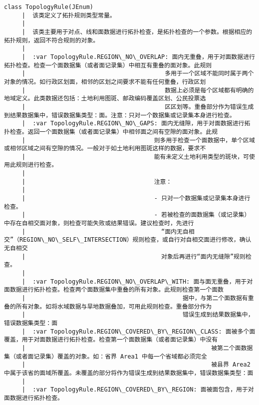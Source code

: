\documentclass[11pt]{article}
\begin{document}
\begin{Verbatim}[commandchars=\\\{\}]
    class TopologyRule(JEnum)
     |  该类定义了拓扑规则类型常量。
     |  
     |  该类主要用于对点、线和面数据进行拓扑检查，是拓扑检查的一个参数。根据相应的拓扑规则，返回不符合规则的对象。
     |  
     |  :var TopologyRule.REGION\_NO\_OVERLAP: 面内无重叠，用于对面数据进行拓扑检查。检查一个面数据集（或者面记录集）中相互有重叠的面对象。此规则
     |                                       多用于一个区域不能同时属于两个对象的情况。如行政区划面，相邻的区划之间要求不能有任何重叠，行政区划
     |                                       数据上必须是每个区域都有明确的地域定义。此类数据还包括：土地利用图斑、邮政编码覆盖区划、公民投票选
     |                                       区区划等。重叠部分作为错误生成到结果数据集中，错误数据集类型：面。注意：只对一个数据集或记录集本身进行检查。
     |  :var TopologyRule.REGION\_NO\_GAPS: 面内无缝隙，用于对面数据进行拓扑检查。返回一个面数据集（或者面记录集）中相邻面之间有空隙的面对象。此规
     |                                    则多用于检查一个面数据中，单个区域或相邻区域之间有空隙的情况。一般对于如土地利用图斑这样的数据，要求不
     |                                    能有未定义土地利用类型的斑块，可使用此规则进行检查。
     |  
     |                                    注意：
     |  
     |                                    - 只对一个数据集或记录集本身进行检查。
     |                                    - 若被检查的面数据集（或记录集）中存在自相交面对象，则检查可能失败或结果错误。建议检查时，先进行
     |                                      “面内无自相交”（REGION\_NO\_SELF\_INTERSECTION）规则检查，或自行对自相交面进行修改，确认无自相交
     |                                      对象后再进行“面内无缝隙”规则检查。
     |  
     |  :var TopologyRule.REGION\_NO\_OVERLAP\_WITH: 面与面无重叠，用于对面数据进行拓扑检查。检查两个面数据集中重叠的所有对象。此规则检查第一个面数
     |                                            据中，与第二个面数据有重叠的所有对象。如将水域数据与旱地数据叠加，可用此规则检查。重叠部分作为
     |                                            错误生成到结果数据集中，错误数据集类型：面
     |  :var TopologyRule.REGION\_COVERED\_BY\_REGION\_CLASS: 面被多个面覆盖，用于对面数据进行拓扑检查。检查第一个面数据集（或者面记录集）中没有
     |                                                    被第二个面数据集（或者面记录集）覆盖的对象。如：省界 Area1 中每一个省域都必须完全
     |                                                    被县界 Area2 中属于该省的面域所覆盖。未覆盖的部分将作为错误生成到结果数据集中，错误数据集类型：面
     |  
     |  :var TopologyRule.REGION\_COVERED\_BY\_REGION: 面被面包含，用于对面数据进行拓扑检查。

\end{Verbatim}
\end{document}
